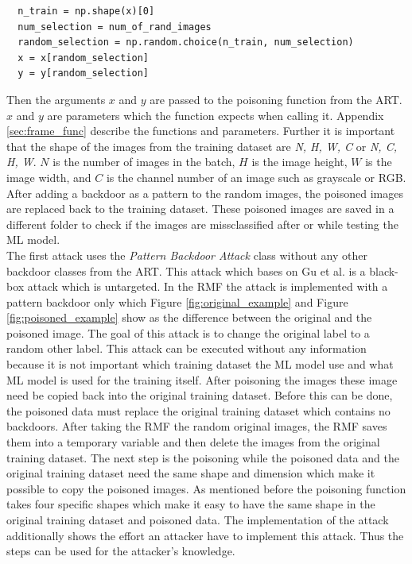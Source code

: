 \begin{lstlisting}
  n_train = np.shape(x)[0]
  num_selection = num_of_rand_images
  random_selection = np.random.choice(n_train, num_selection)
  x = x[random_selection]
  y = y[random_selection]
\end{lstlisting}

Then the arguments $x$ and $y$ are passed to the poisoning function from the ART. $x$ and $y$ are parameters which the function expects when calling it. Appendix \ref{sec:frame_func}
describe the functions and parameters. Further it is important that the shape of the images from the training dataset are \textit{N, H, W, C} or \textit{N, C, H, W}. $N$ is the number of
images in the batch, $H$ is the image height, $W$ is the image width, and $C$ is the channel number of an image such as grayscale or RGB. After adding a backdoor as a pattern to the
random images, the poisoned images are replaced back to the training dataset. These poisoned images are saved in a different folder to check if the images are missclassified after or while
testing the ML model.\\

The first attack uses the \textit{Pattern Backdoor Attack} class without any other backdoor classes from the ART. This attack which bases on Gu et al. \cite{DBLP:journals/corr/abs-1708-06733} is a black-box attack which is untargeted. In the RMF the attack is implemented with a pattern backdoor only which Figure \ref{fig:original_example} and Figure \ref{fig:poisoned_example} show as the
difference between the original and the poisoned image. The goal of this attack is to change the original label to a random other label. This attack can be executed without any
information because it is not important which training dataset the ML model use and what ML model is used for the training itself. After poisoning the images these image need be copied back into the original training dataset. Before this can be done, the poisoned data must replace the original training dataset which contains
no backdoors. After taking the RMF the random original images, the RMF saves them into a temporary variable and then delete the images from the original training dataset. The next step is the
poisoning while the poisoned data and the original training dataset need the same shape and dimension which make it possible to copy the poisoned images. As mentioned before the poisoning
function takes four specific shapes which make it easy to have the same shape in the original training dataset and poisoned data. The implementation of the attack additionally shows the
effort an attacker have to implement this attack. Thus the steps can be used for the attacker's knowledge.

